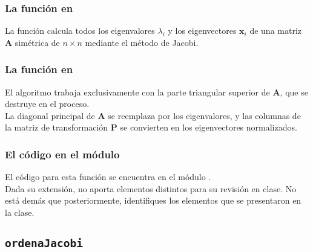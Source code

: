 \documentclass[12pt]{beamer}
\begin{document}
\begin{frame}
\frametitle{La función en \python}
La función  calcula todos los eigenvalores $\lambda_{i}$ y los eigenvectores $\mathbf{x}_{i}$ de una matriz $\mathbf{A}$ simétrica de $n \times n$ mediante el método de Jacobi.
\end{frame}
\begin{frame}
\frametitle{La función en \python}
El algoritmo trabaja exclusivamente con la parte triangular superior de $\mathbf{A}$, que se destruye en el proceso.
\\
\bigskip
\pause
La diagonal principal de $\mathbf{A}$ se reemplaza por los eigenvalores, y las columnas de la matriz de transformación $\mathbf{P}$ se convierten en los eigenvectores normalizados.
\end{frame}
\begin{frame}
\frametitle{El código en el módulo}
El código para esta función  se encuentra en el módulo .
\\
\bigskip
\pause
Dada su extensión, no aporta elementos distintos para su revisión en clase. \pause No está demás que posteriormente, identifiques los elementos que se presentaron en la clase.
\end{frame}

\subsection{\texttt{ordenaJacobi}}
\end{document}
